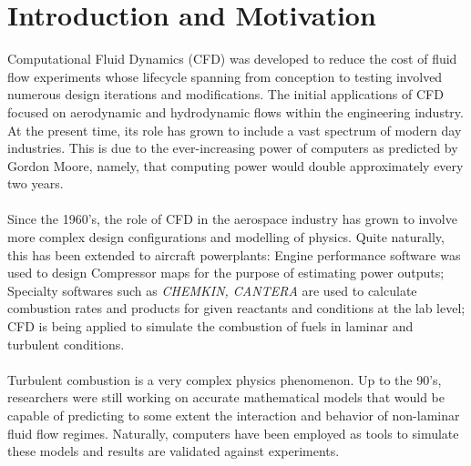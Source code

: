 \documentclass[titlepage,11pt,letterpaper]{article}
\begin{document}
\thispagestyle{empty}\titleRR
\clearpage
\setcounter{page}{1}


\newpage
\section{Introduction and Motivation}
\noindent Computational Fluid Dynamics (CFD) was developed to reduce the cost of fluid flow experiments whose lifecycle spanning from conception to testing involved numerous design iterations and modifications. The initial applications of CFD  focused on aerodynamic and hydrodynamic flows within the engineering industry. At the present time, its role has grown to include a vast spectrum of modern day industries. This is due to the ever-increasing power of computers as predicted by Gordon Moore, namely, that computing power would double approximately every two years.~\cite{intel:2005}\\ \\
\noindent Since the 1960's, the role of CFD in the aerospace industry has grown to involve more complex design configurations and modelling of physics. Quite naturally, this has been extended to aircraft powerplants: Engine performance software was used to design Compressor maps for the purpose of estimating power outputs; Specialty softwares such as \textit{CHEMKIN, CANTERA} are used to calculate combustion rates and products for given reactants and conditions at the lab level; CFD is being applied to simulate the combustion of fuels in laminar and turbulent conditions.\\ \\
\noindent Turbulent combustion is a very complex physics phenomenon. Up to the 90's, researchers were still working on accurate mathematical models that would be capable of predicting to some extent the interaction and behavior of non-laminar fluid flow regimes. Naturally, computers have been employed as tools to simulate these models and results are validated against experiments. \\ \\
\end{document}
